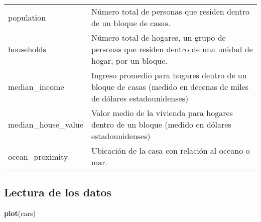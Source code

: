 \documentclass[]{article}
\newenvironment{Shaded}{\begin{snugshade}}{\end{snugshade}}
\newcommand{\KeywordTok}[1]{\textcolor[rgb]{0.13,0.29,0.53}{\textbf{#1}}}
\newcommand{\NormalTok}[1]{#1}
\begin{document}
\begin{longtable}[]{@{}ll@{}}
\begin{minipage}[t]{0.13\columnwidth}
population\strut
\end{minipage} & \begin{minipage}[t]{0.17\columnwidth}\raggedright\strut
Número total de personas que residen dentro de un bloque de casas.\strut
\end{minipage}\tabularnewline
\begin{minipage}[t]{0.13\columnwidth}\raggedright\strut
households\strut
\end{minipage} & \begin{minipage}[t]{0.17\columnwidth}\raggedright\strut
Número total de hogares, un grupo de personas que residen dentro de una
unidad de hogar, por un bloque.\strut
\end{minipage}\tabularnewline
\begin{minipage}[t]{0.13\columnwidth}\raggedright\strut
median\_income\strut
\end{minipage} & \begin{minipage}[t]{0.17\columnwidth}\raggedright\strut
Ingreso promedio para hogares dentro de un bloque de casas (medido en
decenas de miles de dólares estadounidenses)\strut
\end{minipage}\tabularnewline
\begin{minipage}[t]{0.13\columnwidth}\raggedright\strut
median\_house\_value\strut
\end{minipage} & \begin{minipage}[t]{0.17\columnwidth}\raggedright\strut
Valor medio de la vivienda para hogares dentro de un bloque (medido en
dólares estadounidenses)\strut
\end{minipage}\tabularnewline
\begin{minipage}[t]{0.13\columnwidth}\raggedright\strut
ocean\_proximity\strut
\end{minipage} & \begin{minipage}[t]{0.17\columnwidth}\raggedright\strut
Ubicación de la casa con relación al oceano o mar.\strut
\end{minipage}\tabularnewline
\bottomrule
\end{longtable}

\subsection{Lectura de los datos}\label{lectura-de-los-datos}

\begin{Shaded}
\begin{Highlighting}[]
\KeywordTok{plot}\NormalTok{(cars)}
\end{Highlighting}
\end{Shaded}
\end{document}
